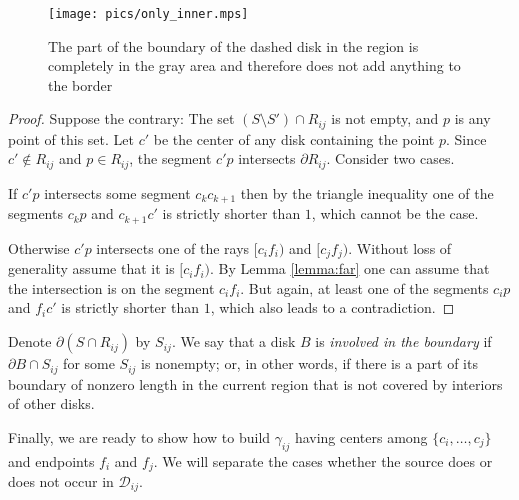 \begin{figure}[h!]
    \centering
    \texttt{[image: pics/only\_inner.mps]}
    \captionsetup{width=.7\textwidth}
    \caption{The part of the boundary of the dashed disk in the region is completely in the gray area and therefore does not add anything to the border}
    \label{fig:only_inner}
\end{figure}


\begin{proof}
Suppose the contrary: The set $(S\setminus S')\cap R_{ij}$ is not empty, and $p$ is any point of this set. Let $c'$ be the center of any disk containing the point $p$. Since $c'\not\in R_{ij}$ and $p\in R_{ij}$, the segment $c'p$ intersects $\partial{R_{ij}}$. Consider two cases.

If $c'p$ intersects some segment $c_kc_{k+1}$ then by the triangle inequality one of the segments $c_kp$ and $c_{k+1}c'$ is strictly shorter than $1$, which cannot be the case.

Otherwise $c'p$ intersects one of the rays $[c_if_i)$ and $[c_jf_j)$. Without loss of generality assume that it is $[c_if_i)$. By Lemma \ref{lemma:far} one can assume that the intersection is on the segment $c_if_i$. But again, at least one of the segments $c_ip$ and $f_ic'$ is strictly shorter than $1$, which also leads to a contradiction.
\end{proof}


Denote $\partial(S\cap R_{ij})$ by $S_{ij}$.
We say that a disk $B$ is \textit{involved in the boundary} if $\partial{B}\cap S_{ij}$ for some $S_{ij}$ is nonempty; or, in other words, if there is a part of its boundary of nonzero length in the current region that is not covered by interiors of other disks. %

Finally, we are ready to show how to build $\gamma_{ij}$ having centers among $\{c_i, \ldots, c_j\}$ and endpoints $f_i$ and $f_j$.
We will separate the cases whether the source does or does not occur in $\mathcal{D}_{ij}$.

